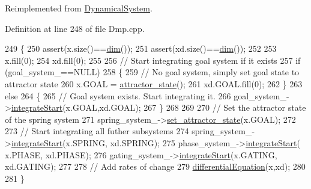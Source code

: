 Reimplemented from \hyperlink{classDmpBbo_1_1DynamicalSystem_a44dd496535fde494d8465e7603c93db3}{Dynamical\+System}.



Definition at line 248 of file Dmp.\+cpp.


\begin{DoxyCode}
249 \{
250   assert(x.size()==\hyperlink{group__DynamicalSystems_ga6f628f7f4ed9d77bf69f5b8560b98f18}{dim}());
251   assert(xd.size()==\hyperlink{group__DynamicalSystems_ga6f628f7f4ed9d77bf69f5b8560b98f18}{dim}());
252   
253   x.fill(0);  
254   xd.fill(0);  
255   
256   \textcolor{comment}{// Start integrating goal system if it exists}
257   \textcolor{keywordflow}{if} (goal\_system\_==NULL)
258   \{
259     \textcolor{comment}{// No goal system, simply set goal state to attractor state}
260     x.GOAL = \hyperlink{group__DynamicalSystems_gaebe3c462bc4a725cb17bcc3d13285f13}{attractor\_state}();
261     xd.GOAL.fill(0);
262   \}
263   \textcolor{keywordflow}{else}
264   \{
265     \textcolor{comment}{// Goal system exists. Start integrating it.}
266     goal\_system\_->\hyperlink{classDmpBbo_1_1DynamicalSystem_a44dd496535fde494d8465e7603c93db3}{integrateStart}(x.GOAL,xd.GOAL);
267   \}
268   
269     
270   \textcolor{comment}{// Set the attractor state of the spring system}
271   spring\_system\_->\hyperlink{group__DynamicalSystems_ga32a975e60b5f001308368c7f06b90e18}{set\_attractor\_state}(x.GOAL);
272   
273   \textcolor{comment}{// Start integrating all futher subsystems}
274   spring\_system\_->\hyperlink{classDmpBbo_1_1DynamicalSystem_a44dd496535fde494d8465e7603c93db3}{integrateStart}(x.SPRING, xd.SPRING);
275   phase\_system\_->\hyperlink{classDmpBbo_1_1DynamicalSystem_a44dd496535fde494d8465e7603c93db3}{integrateStart}(  x.PHASE,  xd.PHASE);
276   gating\_system\_->\hyperlink{classDmpBbo_1_1DynamicalSystem_a44dd496535fde494d8465e7603c93db3}{integrateStart}(x.GATING, xd.GATING);
277 
278   \textcolor{comment}{// Add rates of change}
279   \hyperlink{classDmpBbo_1_1Dmp_ab564468764e7e4dc7c11e2a786e22c19}{differentialEquation}(x,xd);
280   
281 \}
\end{DoxyCode}


